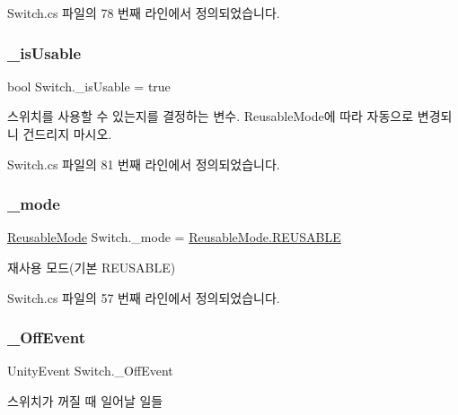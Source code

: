 Switch.\+cs 파일의 78 번째 라인에서 정의되었습니다.

\mbox{\label{class_switch_a6cc73d0665cf08c9a43b10029a652b31}} 
\subsubsection{\texorpdfstring{\_isUsable}{\_isUsable}}
{\footnotesize\ttfamily bool Switch.\+\_\+is\+Usable = true\hspace{0.3cm}{\ttfamily [protected]}}



스위치를 사용할 수 있는지를 결정하는 변수. Reusable\+Mode에 따라 자동으로 변경되니 건드리지 마시오. 



Switch.\+cs 파일의 81 번째 라인에서 정의되었습니다.

\mbox{\label{class_switch_a763af35d8442209649d2a1db2f3aa0cc}} 
\subsubsection{\texorpdfstring{\_mode}{\_mode}}
{\footnotesize\ttfamily \mbox{\hyperlink{class_switch_ab6cd06c871c19ba8fbe1765515a828cc}{Reusable\+Mode}} Switch.\+\_\+mode = \mbox{\hyperlink{class_switch_ab6cd06c871c19ba8fbe1765515a828ccaa9dc406f543aa119dd64d44539c1d621}{Reusable\+Mode.\+R\+E\+U\+S\+A\+B\+LE}}}



재사용 모드(기본 R\+E\+U\+S\+A\+B\+LE) 



Switch.\+cs 파일의 57 번째 라인에서 정의되었습니다.

\mbox{\label{class_switch_a7618e6c742dd3b2e6bb3fe4f56255896}} 
\subsubsection{\texorpdfstring{\_OffEvent}{\_OffEvent}}
{\footnotesize\ttfamily Unity\+Event Switch.\+\_\+\+Off\+Event}



스위치가 꺼질 때 일어날 일들 



